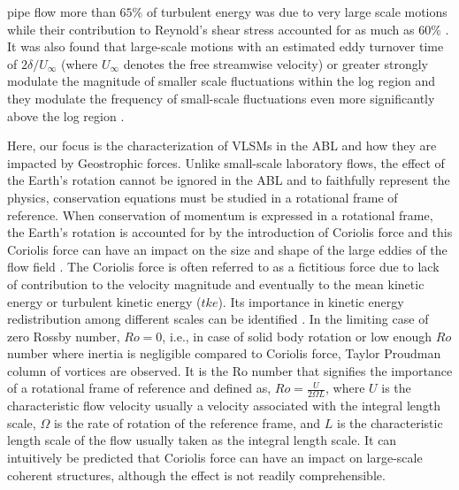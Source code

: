 pipe flow  more than $65\%$ of turbulent energy was due to very large scale motions while their contribution to Reynold's shear stress accounted for as much as $60\%$ \citep{guala_adrian_jfm2006}. It was also found that large-scale motions with an estimated eddy turnover time of $2\delta/U_{\infty}$ (where $U_{\infty}$ denotes the free streamwise velocity) or greater strongly modulate the magnitude of smaller scale fluctuations within the log region and they modulate the frequency of small-scale fluctuations even more significantly above the log region \citep{ganapathi_jfm_2012_modulation}. 


Here, our focus is the characterization of VLSMs in the ABL and how they are impacted by  Geostrophic forces. Unlike small-scale laboratory flows, the effect of the Earth's rotation cannot be ignored in the ABL and to faithfully represent the physics, conservation equations must be studied in a rotational frame of reference.  When conservation of momentum is expressed in a rotational frame, the Earth's rotation is accounted for by the introduction of Coriolis force and this Coriolis force can have an impact on the size and shape of the large eddies of the flow field \citep{esau_jot_2002}. The Coriolis force is often referred to as a fictitious force due to lack of contribution to the velocity magnitude and eventually to the mean kinetic energy or turbulent kinetic energy ($tke$). Its importance in kinetic energy redistribution among different scales can be identified \citep{}. In the limiting case of zero Rossby number, $Ro=0$,  i.e., in case of solid body rotation or low enough $Ro$ number where inertia is negligible compared to Coriolis force, Taylor Proudman column of vortices are observed. It is the Ro number that signifies the  importance of a rotational frame of reference and defined as,  $Ro=\frac{U}{2\Omega L}$, where $U$ is the characteristic flow velocity usually a velocity associated with the integral length scale, $\Omega$ is the rate of rotation of the reference frame, and $L$ is the characteristic length scale of the flow usually taken as the integral length scale. It can  intuitively be predicted that Coriolis force  can have an impact on large-scale coherent structures, although the effect is not readily comprehensible.   

 

